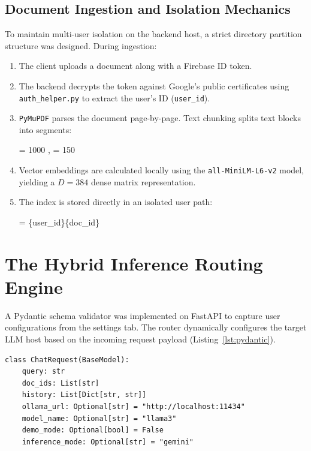 \documentclass[11pt,journal,onecolumn]{article}
\begin{document}
\subsection{Document Ingestion and Isolation Mechanics}
To maintain multi-user isolation on the backend host, a strict directory partition structure was designed. During ingestion:
\begin{enumerate}
    \item The client uploads a document along with a Firebase ID token.
    \item The backend decrypts the token against Google's public certificates using \texttt{auth\_helper.py} to extract the user's ID (\texttt{user\_id}).
    \item \texttt{PyMuPDF} parses the document page-by-page. Text chunking splits text blocks into segments:
    \begin{equation{}}
         = 1000 , \quad {} = 150 
    \end{equation{}}
    \item Vector embeddings are calculated locally using the \texttt{all-MiniLM-L6-v2} model, yielding a $D = 384$ dense matrix representation.
    \item The index is stored directly in an isolated user path:
    \begin{equation{}}
         = \{user\_id\}\{doc\_id\}
    \end{equation{}}
\end{enumerate}

\section{The Hybrid Inference Routing Engine}
A Pydantic schema validator was implemented on FastAPI to capture user configurations from the settings tab. The router dynamically configures the target LLM host based on the incoming request payload (Listing~\ref{lst:pydantic}).

\begin{lstlisting}[style=pythonStyle, caption=Pydantic Request Validation Model., label=lst:pydantic]
class ChatRequest(BaseModel):
    query: str
    doc_ids: List[str]
    history: List[Dict[str, str]]
    ollama_url: Optional[str] = "http://localhost:11434"
    model_name: Optional[str] = "llama3"
    demo_mode: Optional[bool] = False
    inference_mode: Optional[str] = "gemini"
\end{lstlisting}
\end{document}
